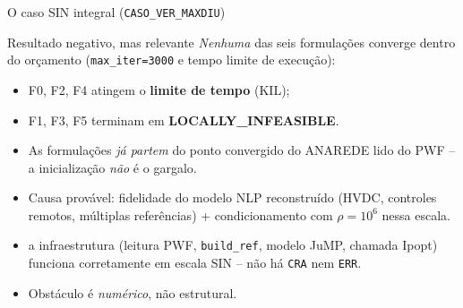 \documentclass{libs/ufc_format}
\begin{document}
\begin{frame}{O caso SIN integral (\texttt{CASO\_VER\_MAXDIU})}
    \begin{alertblock}{Resultado negativo, mas relevante}
        \emph{Nenhuma} das seis formulações converge dentro do orçamento (\texttt{max\_iter=3000} e tempo limite de execução):
        \begin{itemize}
            \item F0, F2, F4 atingem o \textbf{limite de tempo} (KIL);
            \item F1, F3, F5 terminam em \textbf{LOCALLY\_INFEASIBLE}.
        \end{itemize}
    \end{alertblock}

    \vspace{0.2cm}
    \begin{itemize}
        \item As formulações \emph{já partem} do ponto convergido do ANAREDE lido do PWF -- a inicialização \emph{não} é o gargalo.
        \item Causa provável: fidelidade do modelo NLP reconstruído (HVDC, controles remotos, múltiplas referências) + condicionamento com $\rho = 10^6$ nessa escala.
        \item {} a infraestrutura (leitura PWF, \texttt{build\_ref}, modelo JuMP, chamada Ipopt) funciona corretamente em escala SIN -- não há \texttt{CRA} nem \texttt{ERR}.
        \item Obstáculo é \emph{numérico}, não estrutural.
    \end{itemize}
\end{frame}
\end{document}
